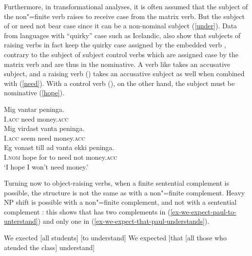 \documentclass[output=paper
	        ,collection
	        ,collectionchapter
 	        ,biblatex
                ,babelshorthands
                ,newtxmath
                ,draftmode
                ,colorlinks, citecolor=brown
]{./langsci/langscibook}
\begin{document}
\eal
{}
\zl
\eal
{}
\zl

Furthermore, in transformational analyses, it is often assumed that the subject of the non"=finite verb  raises to receive case from the matrix verb.
 But the subject of  or  need not bear case  since it can be a non-nominal subject (\ref{under}).
Data from languages with ``quirky'' case such as Icelandic, also show that subjects of raising verbs in fact keep the quirky case assigned by the embedded verb  \citep{Zaenenetal1985}, contrary to the subject of subject control verbs which are assigned case by the matrix verb and are thus in the nominative. A verb like  takes an accusative subject, and a raising verb () takes an accusative subject as well when combined with  (\ref{need}). With a control verb (), on the other hand, the subject must be nominative (\ref{hope}).

\begin{exe}
\ex \begin{xlist}
\ex \gll Mig vantar peninga. \\
I.\textsc{acc} need money.\textsc{acc} \\
\ex \gll Mig virdast vanta peninga. \label{need} \\
I.\textsc{acc} seem need money.\textsc{acc} \\
\ex \gll Eg vonast till ad vanta ekki peninga. \label{hope} \\
I.\textsc{nom} hope for to need not money.\textsc{acc} \\
\glt `I hope I won't need money.'
	\end{xlist}
		
\end{exe}

Turning now to object-raising verbs, when a finite sentential complement is possible, the structure is not the same as  with a non"=finite complement. Heavy NP shift is possible with a non"=finite complement, and not with a sentential complement \citet{Bresnan1982}: this shows that  has two complements in (\ref{ex-we-expect-paul-to-unterstand}) and only one in (\ref{ex-we-expect-that-paul-understands}).

\eal
\ex We exected [all students] [to understand]
\ex We expected [that [all those who atended the class] understand]
\zl
\end{document}
